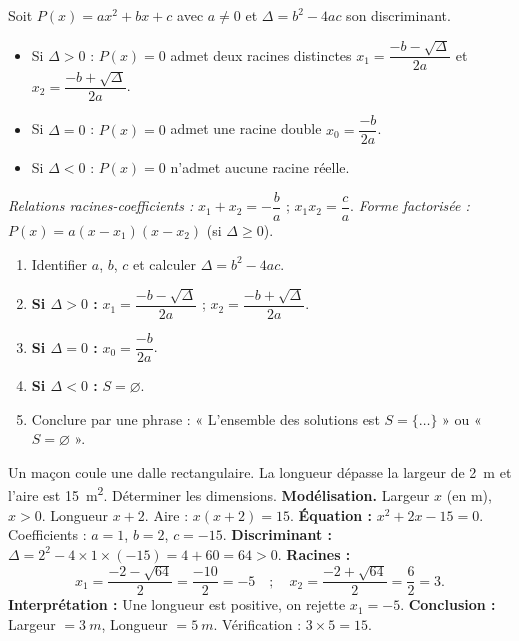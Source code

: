 \documentclass[11pt]{article}
\newcommand{\cle}[1]{{\popxbold\color{popdark}#1}}
\begin{document}
\begin{propriete}
Soit $P(x)=ax^2+bx+c$ avec $a\neq 0$ et $\Delta=b^2-4ac$ son \cle{discriminant}.
\begin{itemize}
\item Si $\Delta>0$ : $P(x)=0$ admet deux racines distinctes $x_1=\dfrac{-b-\sqrt{\Delta}}{2a}$ et $x_2=\dfrac{-b+\sqrt{\Delta}}{2a}$.
\item Si $\Delta=0$ : $P(x)=0$ admet une racine double $x_0=\dfrac{-b}{2a}$.
\item Si $\Delta<0$ : $P(x)=0$ n'admet aucune racine réelle.
\end{itemize}
\emph{Relations racines-coefficients :} $x_1+x_2=-\dfrac{b}{a}$ ; $x_1x_2=\dfrac{c}{a}$.
\emph{Forme factorisée :} $P(x)=a(x-x_1)(x-x_2)$ (si $\Delta\geq 0$).
\end{propriete}

\begin{methode}
\begin{enumerate}
\item Identifier $a$, $b$, $c$ et calculer $\Delta=b^2-4ac$.
\item \textbf{Si $\Delta>0$ :} $x_1=\dfrac{-b-\sqrt{\Delta}}{2a}$ ; $x_2=\dfrac{-b+\sqrt{\Delta}}{2a}$.
\item \textbf{Si $\Delta=0$ :} $x_0=\dfrac{-b}{2a}$.
\item \textbf{Si $\Delta<0$ :} $S=\varnothing$.
\item Conclure par une phrase : « L'ensemble des solutions est $S=\{\ldots\}$ » ou « $S=\varnothing$ ».
\end{enumerate}
\end{methode}

\begin{exoresolu}
Un maçon coule une dalle rectangulaire. La longueur dépasse la largeur de \SI{2}{m} et l'aire est \SI{15}{m^2}. Déterminer les dimensions.
\tcblower
\textbf{Modélisation.} Largeur $x$ (en m), $x>0$. Longueur $x+2$. Aire : $x(x+2)=15$.
\textbf{Équation :} $x^2+2x-15=0$. Coefficients : $a=1$, $b=2$, $c=-15$.
\textbf{Discriminant :} $\Delta=2^2-4\times1\times(-15)=4+60=64>0$.
\textbf{Racines :}
\[x_1=\frac{-2-\sqrt{64}}{2}=\frac{-10}{2}=-5 \quad;\quad x_2=\frac{-2+\sqrt{64}}{2}=\frac{6}{2}=3.\]
\textbf{Interprétation :} Une longueur est positive, on rejette $x_1=-5$.
\textbf{Conclusion :} Largeur $=\SI{3}{m}$, Longueur $=\SI{5}{m}$. Vérification : $3\times5=15$.
\end{exoresolu}
\end{document}
